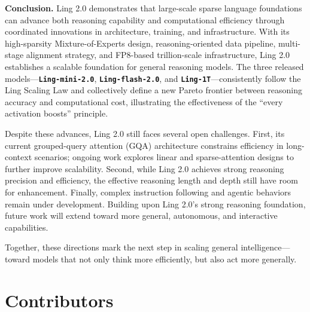 \documentclass[table]{gtech}
\theoremstyle{definition}
\begin{document}
\textbf{Conclusion.} 
Ling 2.0 demonstrates that large-scale sparse language foundations can advance both reasoning capability and computational efficiency through coordinated innovations in architecture, training, and infrastructure. With its high-sparsity Mixture-of-Experts design, reasoning-oriented data pipeline, multi-stage alignment strategy, and FP8-based trillion-scale infrastructure, Ling 2.0 establishes a scalable foundation for general reasoning models. The three released models—\textbf{\texttt{Ling-mini-2.0}}, \textbf{\texttt{Ling-flash-2.0}}, and \textbf{\texttt{Ling-1T}}—consistently follow the Ling Scaling Law and collectively define a new Pareto frontier between reasoning accuracy and computational cost, illustrating the effectiveness of the ``every activation boosts'' principle.  

Despite these advances, Ling 2.0 still faces several open challenges. 
First, its current grouped-query attention (GQA) architecture constrains efficiency in long-context scenarios; ongoing work explores linear and sparse-attention designs to further improve scalability. 
Second, while Ling 2.0 achieves strong reasoning precision and efficiency, the effective reasoning length and depth still have room for enhancement. 
Finally, complex instruction following and agentic behaviors remain under development. Building upon Ling 2.0's strong reasoning foundation, future work will extend toward more general, autonomous, and interactive capabilities.  

Together, these directions mark the next step in scaling general intelligence---toward models that not only think more efficiently, but also act more generally.

\clearpage
\section{Contributors}
\label{sec:contri}
\end{document}
